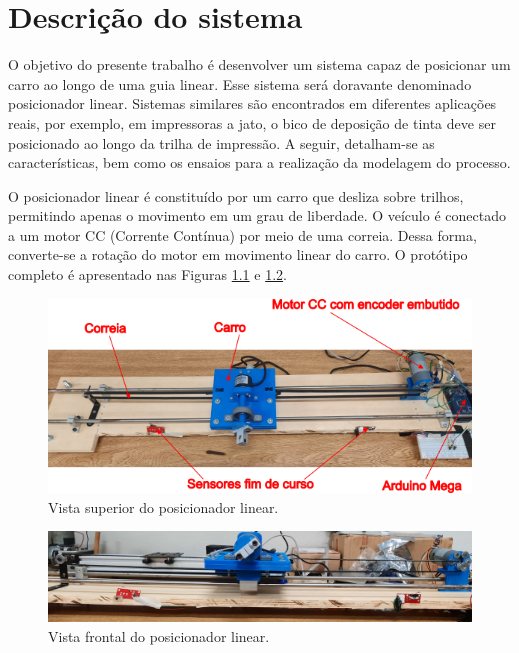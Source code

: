 \chapter{Descrição do sistema}

O objetivo do presente trabalho é desenvolver um sistema capaz de posicionar um carro ao longo de uma guia linear. Esse sistema será doravante denominado posicionador linear. Sistemas similares são encontrados em diferentes aplicações reais, por exemplo, em impressoras a jato, o bico de deposição de tinta deve ser posicionado ao longo da trilha de impressão. A seguir, detalham-se as características, bem como os ensaios para a realização da modelagem do processo.

O posicionador linear é constituído por um carro que desliza sobre trilhos, permitindo apenas o movimento em um grau de liberdade. O veículo é conectado a um motor CC (Corrente Contínua) por meio de uma correia. Dessa forma, converte-se a rotação do motor em movimento linear do carro. O protótipo completo é apresentado nas Figuras \ref{fig:vista_superior} e \ref{fig:vista_frontal}.

\begin{figure}[H]
    \centering
    \includegraphics[width=1\linewidth]{figuras/planta_vista_superior.png}
    \caption[Vista superior do posicionador linear]{Vista superior do posicionador linear.}
    \label{fig:vista_superior}
\end{figure}

\begin{figure}[H]
    \centering
    \includegraphics[width=1\linewidth]{figuras/planta_vista_frontal.jpg}
    \caption[Vista frontal do posicionador linear]{Vista frontal do posicionador linear.}
    \label{fig:vista_frontal}
\end{figure}

